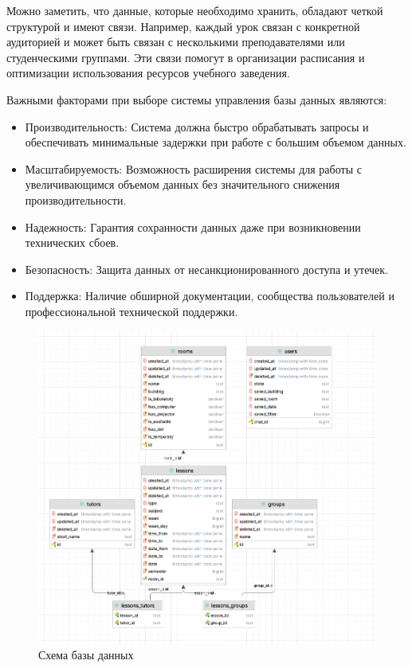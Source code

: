 Можно заметить, что данные, которые необходимо хранить, обладают четкой
структурой и имеют связи. Например, каждый урок связан с конкретной аудиторией и
может быть связан с несколькими преподавателями или студенческими группами. Эти
связи помогут в организации расписания и оптимизации использования ресурсов
учебного заведения.

Важными факторами при выборе системы управления базы данных являются:
\begin{itemize}
    \item Производительность: Система должна быстро обрабатывать запросы и
обеспечивать минимальные задержки при работе с большим объемом данных.
    \item Масштабируемость: Возможность расширения системы для работы с
увеличивающимся объемом данных без значительного снижения производительности.
    \item Надежность: Гарантия сохранности данных даже при возникновении
технических сбоев.
    \item Безопасность: Защита данных от несанкционированного доступа и утечек.
    \item Поддержка: Наличие обширной документации, сообщества пользователей и
профессиональной технической поддержки.
\end{itemize}

\begin{figure}[h]
    \centering
    \includegraphics[scale=0.6]{img/bd}
    \caption{Схема базы данных}
    \label{fig:cp}
\end{figure}


